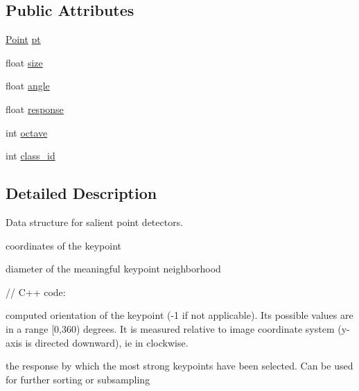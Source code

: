 \subsection*{Public Attributes}
\begin{DoxyCompactItemize}
\item 
\mbox{\hyperlink{classorg_1_1opencv_1_1core_1_1_point}{Point}} \mbox{\hyperlink{classorg_1_1opencv_1_1features2d_1_1_key_point_aa32e9c9c90cf525a04137368636205c9}{pt}}
\item 
float \mbox{\hyperlink{classorg_1_1opencv_1_1features2d_1_1_key_point_aff65ea537ec0b3510fc0eb1472588c68}{size}}
\item 
float \mbox{\hyperlink{classorg_1_1opencv_1_1features2d_1_1_key_point_a3b851700d50a8e8bc8e1c1340dac7470}{angle}}
\item 
float \mbox{\hyperlink{classorg_1_1opencv_1_1features2d_1_1_key_point_a161c4cf71a23c1716c3e9636e1d0ab71}{response}}
\item 
int \mbox{\hyperlink{classorg_1_1opencv_1_1features2d_1_1_key_point_a63257aa818d9c7546c92305b0af79218}{octave}}
\item 
int \mbox{\hyperlink{classorg_1_1opencv_1_1features2d_1_1_key_point_a4f705d04c9d7bc8d8d0360146d087dae}{class\+\_\+id}}
\end{DoxyCompactItemize}


\subsection{Detailed Description}
Data structure for salient point detectors.

coordinates of the keypoint

diameter of the meaningful keypoint neighborhood {\ttfamily }

{\ttfamily }

{\ttfamily }

{\ttfamily // C++ code\+:}

{\ttfamily }

{\ttfamily }

{\ttfamily computed orientation of the keypoint (-\/1 if not applicable). Its possible values are in a range \mbox{[}0,360) degrees. It is measured relative to image coordinate system (y-\/axis is directed downward), ie in clockwise.}

{\ttfamily }

{\ttfamily }

{\ttfamily the response by which the most strong keypoints have been selected. Can be used for further sorting or subsampling}

